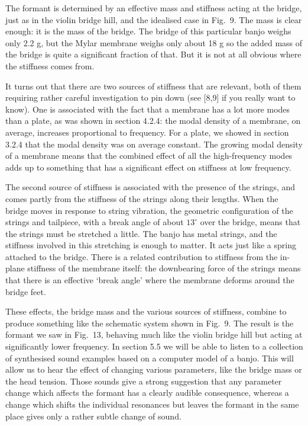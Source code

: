   The formant is determined by an effective mass and stiffness acting at the 
  bridge, just as in the violin bridge hill, and the idealised case in Fig.\ 9. 
  The mass is clear enough: it is the mass of the bridge. The bridge of this 
  particular banjo weighs only 2.2 g, but the Mylar membrane weighs only about 
  18 g so the added mass of the bridge is quite a significant fraction of that. 
  But it is not at all obvious where the stiffness comes from. 

  It turns out that there are two sources of stiffness that are relevant, both 
  of them requiring rather careful investigation to pin down (see [8,9] if you 
  really want to know). One is associated with the fact that a membrane has a 
  lot more modes than a plate, as was shown in section 4.2.4: the modal density 
  of a membrane, on average, increases proportional to frequency. For a plate, 
  we showed in section 3.2.4 that the modal density was on average constant. 
  The growing modal density of a membrane means that the combined effect of all 
  the high-frequency modes adds up to something that has a significant effect 
  on stiffness at low frequency. 

  The second source of stiffness is associated with the presence of the 
  strings, and comes partly from the stiffness of the strings along their 
  lengths. When the bridge moves in response to string vibration, the geometric 
  configuration of the strings and tailpiece, with a break angle of about 
  $13^\circ$ over the bridge, means that the strings must be stretched a 
  little. The banjo has metal strings, and the stiffness involved in this 
  stretching is enough to matter. It acts just like a spring attached to the 
  bridge. There is a related contribution to stiffness from the in-plane 
  stiffness of the membrane itself: the downbearing force of the strings means 
  that there is an effective `break angle' where the membrane deforms around 
  the bridge feet. 

  These effects, the bridge mass and the various sources of stiffness, combine 
  to produce something like the schematic system shown in Fig.\ 9. The result 
  is the formant we saw in Fig.\ 13, behaving much like the violin bridge hill 
  but acting at significantly lower frequency. In section 5.5 we will be able 
  to listen to a collection of synthesised sound examples based on a computer 
  model of a banjo. This will allow us to hear the effect of changing various 
  parameters, like the bridge mass or the head tension. Those sounds give a 
  strong suggestion that any parameter change which affects the formant has a 
  clearly audible consequence, whereas a change which shifts the individual 
  resonances but leaves the formant in the same place gives only a rather 
  subtle change of sound. 


